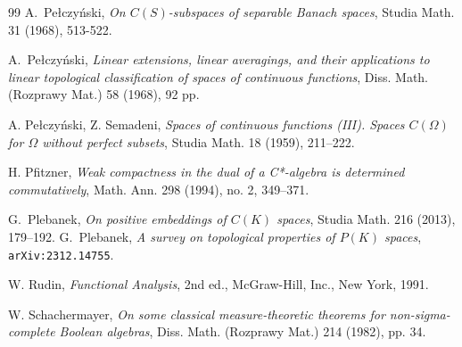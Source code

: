 \documentclass[12pt,fleqn]{amsart}
\numberwithin{equation}{section}
\theoremstyle{definition}
\begin{document}
\begin{thebibliography}{99}
A.\ Pe{\l}czy\'nski, {\em On $C(S)$-subspaces of separable Banach spaces}, Studia Math. 31 (1968), 513-522.

 A.\ Pe{\l}czy\'nski, {\em  Linear extensions, linear averagings, and their applications to linear topological classification of spaces of continuous functions},  Diss. Math. (Rozprawy Mat.) 58 (1968), 92 pp.

A. Pe\l czy\'{n}ski, Z. Semadeni, {\em Spaces of continuous functions (III). Spaces $C(\Omega)$ for $\Omega$ without perfect subsets}, Studia Math. 18 (1959), 211--222.

H. Pfitzner, {\em Weak compactness in the dual of a C*-algebra is determined commutatively}, Math. Ann. 298 (1994), no. 2, 349--371.
 
  G.\ Plebanek, {\em On positive embeddings of $C(K)$ spaces},   Studia Math. 
  216 (2013),  179--192.  
 G.\ Plebanek, {\em A survey on topological properties of $P(K)$ spaces}, 
 \texttt{arXiv:2312.14755}.

W. Rudin, {\em Functional Analysis}, 2nd ed., McGraw-Hill, Inc., New York, 1991.

W. Schachermayer, {\em On some classical measure-theoretic theorems for non-sigma-complete Boolean algebras}, Diss. Math. (Rozprawy Mat.) 214 (1982), pp. 34.
  
\end{thebibliography}
\end{document}
